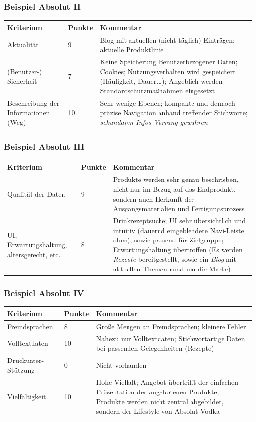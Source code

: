 \begin{frame}
	\frametitle{Beispiel Absolut II}
	\begin{tabular}{|p{}|l|p{6cm}|}
	\hline
	  Kriterium & Punkte & Kommentar \\ \hline
  	  Aktualität & 9 & Blog mit aktuellen (nicht täglich) Einträgen; aktuelle Produktlinie \\ \hline
	  (Benutzer-) Sicherheit & 7 & Keine Speicherung Benutzerbezogener Daten; Cookies; Nutzungsverhalten wird gespeichert (Häufigkeit, Dauer...); Angeblich werden Standardschutzmaßnahmen eingesetzt \\ \hline
	  Beschreibung der Informationen (Weg) & 10 & Sehr wenige Ebenen; kompakte und dennoch präzise Navigation anhand treffender Stichworte; \emph{sekundären Infos Vorrang gewähren} \\ \hline
 	\end{tabular}
\end{frame}

\begin{frame}
	\frametitle{Beispiel Absolut III}
	\begin{tabular}{|p{}|l|p{6cm}|}
	\hline
	  Kriterium & Punkte & Kommentar \\ \hline
	  Qualität der Daten & 9 & Produkte werden sehr genau beschrieben, nicht nur im Bezug auf das Endprodukt, sondern auch Herkunft der Ausgangsmaterialien und Fertigungsprozess \\ \hline
	  UI, Erwartungshaltung, altersgerecht, etc. & 8 & Drinkrezeptsuche; UI sehr übersichtlich und intuitiv (dauernd eingeblendete Navi-Leiste oben), sowie passend für Zielgruppe; Erwartungshaltung übertroffen (Es werden \emph{Rezepte} bereitgestellt, sowie ein \emph{Blog} mit aktuellen Themen rund um die Marke) \\ \hline
 	\end{tabular}
\end{frame}

\begin{frame}
	\frametitle{Beispiel Absolut IV}
	\begin{tabular}{|p{}|l|p{6cm}|}
	\hline
	  Kriterium & Punkte & Kommentar \\ \hline
	  Fremdsprachen & 8 & Große Mengen an Fremdsprachen; kleinere Fehler \\ \hline
	  Volltextdaten & 10 & Nahezu nur Volltextdaten; Stichwortartige Daten bei passenden Gelegenheiten (Rezepte) \\ \hline
	  Druckunter- Stützung & 0 & Nicht vorhanden \\ \hline
	  Vielfältigkeit & 10 & Hohe Vielfalt; Angebot übertrifft der einfachen Präsentation der angebotenen Produkte; Produkte werden nicht zentral abgebildet, sondern der Lifestyle von Absolut Vodka \\ \hline
 	\end{tabular}
\end{frame}

